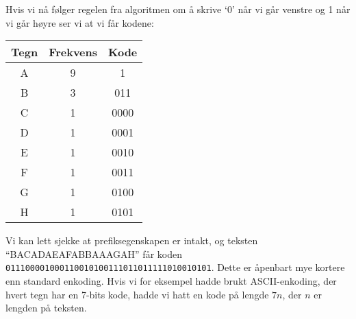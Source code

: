 			Hvis vi nå følger regelen fra algoritmen om å skrive `0' når vi går venstre og 1 når vi går høyre ser vi at vi får kodene:
			\begin{center}
				\begin{tabular}{c c c}
					Tegn & Frekvens & Kode \\
					\hline
					A & 9 & 1\\
					B & 3 & 011\\
					C & 1 & 0000\\
					D & 1 & 0001\\
					E & 1 & 0010\\
					F & 1 & 0011\\
					G & 1 & 0100\\
					H & 1 & 0101
				\end{tabular}
			\end{center}
			Vi kan lett sjekke at prefiksegenskapen er intakt, og teksten ``BACADAEAFABBAAAGAH'' får koden \verb|011100001000110010100111011011111010010101|. Dette er åpenbart mye kortere enn standard enkoding. Hvis vi for eksempel hadde brukt ASCII-enkoding, der hvert tegn har en 7-bits kode, hadde vi hatt en kode på lengde $7n$, der $n$ er lengden på teksten.